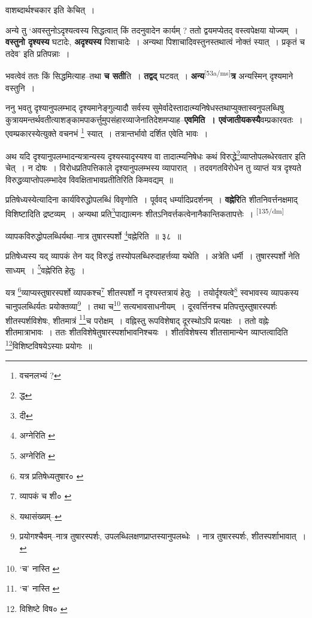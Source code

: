 \documentclass[article,12pt,a4paper]{memoir}
\begin{document}
	  \pstart वाशब्दार्थश्चकार इति केचित् ।
	\pend
      

	  \pstart अन्ये तु ‘अवस्तुनोऽदृश्यत्वस्य सिद्धत्वात् किं तदनुवादेन कार्यम् ? ततो द्वयमप्येतद् वस्त्वपेक्षया योज्यम् । \textbf{वस्तुनो दृश्यस्य} घटादेः, \textbf{अदृश्यस्य} पिशाचादेः । अन्यथा पिशाचादिवस्तुनस्तथात्वं नोक्तं स्यात् । प्रकृतं च तदेव’ इति प्रतिपन्नाः ।
	\pend
      

	  \pstart भवत्वेवं ततः किं सिद्धमित्याह--तथा \textbf{च सती}ति । \textbf{तद्वद्} घटवत् । \textbf{अन्य}\leavevmode\textsuperscript{\rmlatinfont\tiny [53a/ms]}\textbf{त्र} अन्यस्मिन् दृश्यमाने वस्तुनि ।
	\pend
      

	  \pstart ननु भवतु दृश्यानुपलम्भाद् दृश्यमानेङ्गुल्यादौ सर्वस्य सुमेर्वादेस्तादात्म्यनिषेधस्तथाप्युक्तास्वनुपलब्धिषु कुत्रायमन्तर्थवतीत्याशङ्कामपाकर्त्तुमुपसंहारव्याजेनातिदेशमप्याह--\textbf{एवमिति । एवंजातीयकस्यै}वम्प्रकारवतः । एवम्प्रकारस्येत्युक्ते वचनभं \footnote{वचनलभ्यं ?} स्यात् । तत्रान्तर्भावो दर्शित एवेति भावः ।
	\pend
      

	  \pstart अथ यदि दृश्यानुपलम्भादन्यत्रान्यस्य दृश्यस्यादृस्यश्य वा तादात्म्यनिषेधः कथं विरुद्धे\footnote{द्ध}व्याप्तोपलब्धेरवतार इति चेत् । न दोषः । विरोधप्रतिपत्तिकाले दृश्यानुपलम्भस्य व्यापारात् । तदवगतविरोधेन तु व्याप्तं यत्र दृश्यते विरुद्धव्याप्तोपलम्भादेव विवक्षिताभावप्रतीतिरिति किमवद्यम् ॥
	\pend
      

	  \pstart प्रतिषेध्यस्येत्यादिना कार्यविरुद्धोपलब्धिं विवृणोति । पूर्ववद् धर्म्यादिप्रदर्शनम् । \textbf{वह्नेरि}ति शीतनिवर्त्तनक्षमाद् विशिष्टादिति द्रष्टव्यम् । अन्यथा प्रति\footnote{दी}पाद्यात्मनः शीतऽनिवर्त्तकत्वेनानैकान्तिकतापत्तेः ।
	\pend
      \leavevmode\textsuperscript{\rmlatinfont\tiny [135/dm]}

	  \pstart व्यापकविरुद्धोपलब्धिर्यथा--नात्र तुषारस्पर्शो \footnote{अग्नेरिति \cite{dp-msB} \cite{dp-msC} \cite{dp-edP} \cite{dp-edH} \cite{dp-edN} \cite{dp-edE}}वह्नेरिति ॥ ३८ ॥
	\pend
       

	  \pstart प्रतिषेध्यस्य यद् व्यापकं तेन यद् विरुद्धं तस्योपलब्धिरुदाहर्त्तव्या यथेति । अत्रेति धर्मी । तुषारस्पर्शो नेति साध्यम् । \footnote{अग्नेरिति \cite{dp-msD} \cite{dp-msB}}वह्नेरिति हेतुः ।
	\pend
       

	  \pstart यत्र \footnote{यत्र प्रतिषेध्यतुषार० \cite{dp-msC}}व्याप्यस्तुषारस्पर्शो व्यापकश्च\footnote{व्यापकं च शी० \cite{dp-msD}} शीतस्पर्शो न दृश्यस्तत्रायं हेतुः । तयोर्दृश्यत्वे\footnote{यथासंख्यम्--\cite{dp-msD-n}} स्वभावस्य व्यापकस्य चानुपलब्धिर्यतः प्रयोक्तव्या\footnote{प्रयोगश्चैवम्--नात्र तुषारस्पर्शः, उपलब्धिलक्षणप्राप्तस्यानुपलब्धेः । नात्र तुषारस्पर्शः, शीतस्पर्शाभावात् ।} । तथा च\footnote{‘च’ नास्ति \cite{dp-msB} \cite{dp-edP} \cite{dp-edE}} सत्यभावसाधनीयम् । दूरवर्त्तिनश्च प्रतिपत्तुस्तुषारस्पर्शः शीतस्पर्शविशेषः, शीतमात्रं \footnote{‘च’ नास्ति \cite{dp-msB}}च परोक्षम् । वह्निस्तु रूपविशेषाद् दूरस्थोऽपि प्रत्यक्षः । ततो वह्नेः शीतमात्राभावः । ततः शीतविशेषेतुषारस्पर्शाभावनिश्चयः । शीतविशेषस्य शीतसामान्येन व्याप्तत्वादिति \footnote{विशिष्टे विष० \cite{dp-msB}}विशिष्टविषयेऽस्याः प्रयोगः ॥
	\pend
       
\end{document}
